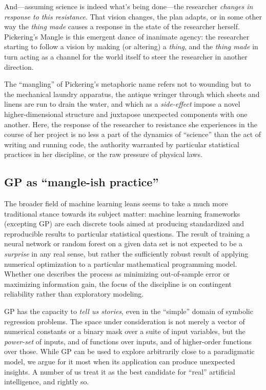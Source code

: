 And---assuming science is indeed what's being done---the researcher \emph{changes in response to this resistance}. That vision changes, the plan adapts, or in some other way the \emph{thing made} causes a response in the state of the researcher herself. Pickering's Mangle is this emergent dance of inanimate agency: the researcher starting to follow a vision by making (or altering) a \emph{thing}, and the \emph{thing made} in turn acting as a channel for the world itself to steer the researcher in another direction.

The ``mangling'' of Pickering's metaphoric name refers not to wounding but to the mechanical laundry apparatus, the antique wringer through which sheets and linens are run to drain the water, and which as a \emph{side-effect} impose a novel higher-dimensional structure and juxtapose unexpected components with one another. Here, the response of the researcher to resistance she experiences in the course of her project is no less a part of the dynamics of ``science'' than the act of writing and running code, the authority warranted by particular statistical practices in her discipline, or the raw pressure of physical laws.

\subsection{GP as ``mangle-ish practice''}\hypertarget{gp-as-mangle-ish-practice}{}\label{gp-as-mangle-ish-practice}

The broader field of machine learning leans seems to take a much more traditional stance towards its subject matter: machine learning frameworks (excepting GP) are each discrete tools aimed at producing standardized and reproducible results to particular statistical questions. The result of training a neural network or random forest on a given data set is not expected to be a \emph{surprise} in any real sense, but rather the sufficiently robust result of applying numerical optimization to a particular mathematical programming model. Whether one describes the process as minimizing out-of-sample error or maximizing information gain, the focus of the discipline is on contingent reliability rather than exploratory modeling.

GP has the capacity to \emph{tell us stories}, even in the ``simple'' domain of symbolic regression problems. The space under consideration is not merely a vector of numerical constants or a binary mask over a suite of input variables, but the \emph{power-set} of inputs, and of functions over inputs, and of higher-order functions over those. While GP can be used to explore arbitrarily close to a paradigmatic model, we argue for it most when its application can produce unexpected insights. A number of us treat it as the best candidate for ``real'' artificial intelligence, and rightly so.

